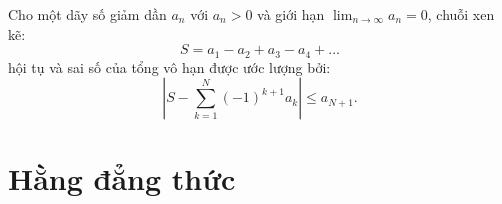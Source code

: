 \documentclass[../imo-training-open-book.tex]{subfiles}
\begin{document}
\begin{theorem}
    \label{theorem:alternating-series-inequality}
    Cho một dãy số giảm dần \( a_n \) với \( a_n > 0 \) và giới hạn \(\lim_{n \to \infty} a_n = 0 \), chuỗi xen kẽ:
    \[
        S = a_1 - a_2 + a_3 - a_4 + \dots
    \]
    hội tụ và sai số của tổng vô hạn được ước lượng bởi:
    \[
        \left| S - \sum_{k=1}^{N} (-1)^{k+1} a_k \right| \leq a_{N+1}.
    \]
\end{theorem}

\newpage

\chapter{Hằng đẳng thức}

\newpage
\end{document}
